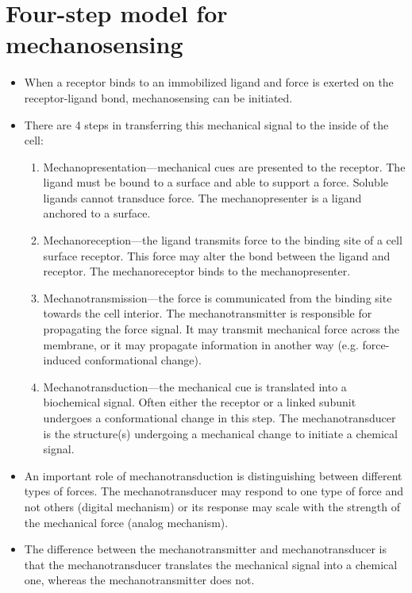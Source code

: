 \documentclass[
10pt, %
letterpaper, %
twocolumn, %
landscape %
]{article}
\begin{document}
\section{Four-step model for mechanosensing}

\begin{itemize}
\item When a receptor binds to an immobilized ligand and force is
  exerted on the receptor-ligand bond, mechanosensing can be
  initiated.
\item There are 4 steps in transferring this mechanical signal to the
  inside of the cell:
  \begin{enumerate}
  \item Mechanopresentation---mechanical cues are presented to the
    receptor. The ligand must be bound to a surface and able to support
    a force. Soluble ligands cannot transduce force. The
    mechanopresenter is a ligand anchored to a surface.
  \item Mechanoreception---the ligand transmits force to the binding site
    of a cell surface receptor. This force may alter the bond between
    the ligand and receptor. The mechanoreceptor binds to the
    mechanopresenter.
  \item Mechanotransmission---the force is communicated from the binding
    site towards the cell interior. The mechanotransmitter is
    responsible for propagating the force signal. It may transmit
    mechanical force across the membrane, or it may propagate
    information in another way (e.g. force-induced conformational
    change). 
  \item Mechanotransduction---the mechanical cue is translated into a
    biochemical signal. Often either the receptor or a linked subunit
    undergoes a conformational change in this step. The
    mechanotransducer is the structure(s) undergoing a mechanical
    change to initiate a chemical signal. 
  \end{enumerate}
\item An important role of mechanotransduction is distinguishing
  between different types of forces. The mechanotransducer may respond
  to one type of force and not others (digital mechanism) or its
  response may scale with the strength of the mechanical force (analog
  mechanism). 
\item The difference between the mechanotransmitter and
  mechanotransducer is that the mechanotransducer translates the
  mechanical signal into a chemical one, whereas the
  mechanotransmitter does not.
\end{itemize}
\end{document}
